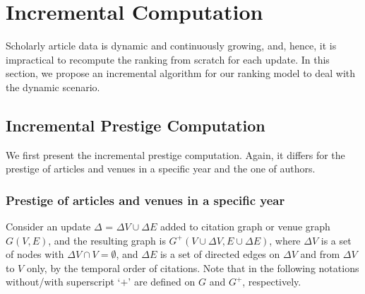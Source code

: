 \section{Incremental Computation}
\label{sec-incAlg}

Scholarly article data is dynamic and continuously growing, and, hence, it is impractical to recompute the ranking from scratch for each update. In this section, we propose an incremental algorithm for our ranking model \ensemblerank to deal with  the dynamic scenario.


\subsection{Incremental Prestige Computation}
\label{subsec-inc-citation}

We first present the incremental  prestige computation. Again, it differs for the prestige of articles and venues in a specific year and the one of authors.

\subsubsection{Prestige of articles and venues in a specific year}
\label{subsubsec-incprs-CV}
Consider an update $\Delta$ = $\Delta V\cup\Delta E$ added to citation graph or venue graph $G(V, E)$,
and the resulting graph is $G^+(V\cup\Delta V, E\cup\Delta E)$, where
$\Delta V$ is a set of nodes with $\Delta V\cap V = \emptyset$, and $\Delta E$ is a set of directed edges on $\Delta V$ and from $\Delta V$ to $V$ only, by the temporal order of citations.
Note that in the following notations without/with superscript `$+$' are defined on $G$ and $G^+$, respectively.


